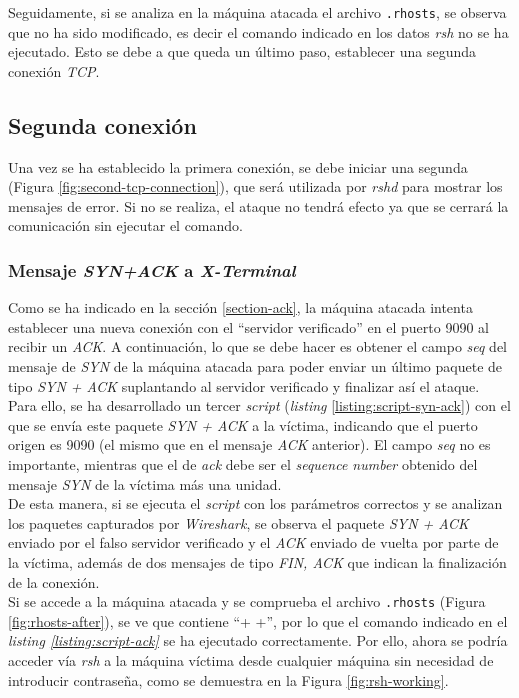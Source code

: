 \documentclass{article}
\begin{document}
Seguidamente, si se analiza en la máquina atacada el archivo \texttt{.rhosts}, se observa que no ha sido modificado, es decir el comando indicado en los datos \textit{rsh} no se ha ejecutado. Esto se debe a que queda un último paso, establecer una segunda conexión \textit{TCP}.

\subsection{Segunda conexión}
\label{section-second-connect}

Una vez se ha establecido la primera conexión, se debe iniciar una segunda (Figura \ref{fig:second-tcp-connection}), que será utilizada por \textit{rshd} para mostrar los mensajes de error. Si no se realiza, el ataque no tendrá efecto ya que se cerrará la comunicación sin ejecutar el comando. \\

\subsubsection{Mensaje \textit{SYN+ACK} a \textit{X-Terminal}}

Como se ha indicado en la sección \ref{section-ack}, la máquina atacada intenta establecer una nueva conexión con el ``servidor verificado'' en el puerto 9090 al recibir un \textit{ACK}. A continuación, lo que se debe hacer es obtener el campo \textit{seq} del mensaje de \textit{SYN} de la máquina atacada para poder enviar un último paquete de tipo \textit{SYN + ACK} suplantando al servidor verificado y finalizar así el ataque.\\
Para ello, se ha desarrollado un tercer \textit{script} (\textit{listing} \ref{listing:script-syn-ack}) con el que se envía este paquete \textit{SYN + ACK} a la víctima, indicando que el puerto origen es 9090 (el mismo que en el mensaje \textit{ACK} anterior). El campo \textit{seq} no es importante, mientras que el de \textit{ack} debe ser el \textit{sequence number} obtenido del mensaje \textit{SYN} de la víctima más una unidad.\\

De esta manera, si se ejecuta el \textit{script} con los parámetros correctos y se analizan los paquetes capturados por \textit{Wireshark}, se observa el paquete \textit{SYN + ACK} enviado por el falso servidor verificado y el \textit{ACK} enviado de vuelta por parte de la víctima, además de dos mensajes de tipo \textit{FIN, ACK} que indican la finalización de la conexión. \\
Si se accede a la máquina atacada y se comprueba el archivo \texttt{.rhosts} (Figura \ref{fig:rhosts-after}), se ve que contiene ``+ +'', por lo que el comando indicado en el \textit{listing \ref{listing:script-ack}} se ha ejecutado correctamente. Por ello, ahora se podría acceder vía \textit{rsh} a la máquina víctima desde cualquier máquina sin necesidad de introducir contraseña, como se demuestra en la Figura \ref{fig:rsh-working}.
\end{document}
